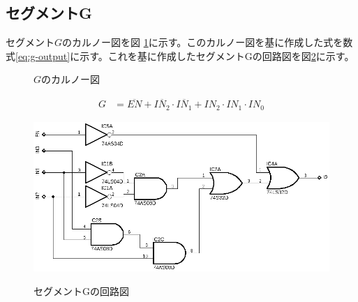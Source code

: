 \documentclass[a4paper,11pt,dvipdfmx]{jsarticle}
\begin{document}
\subsection{セグメントG}
セグメント$G$のカルノー図を図 \ref{fig:karnoG}に示す。このカルノー図を基に作成した式を数式\eqref{eq:g-output}に示す。これを基に作成したセグメントGの回路図を図\ref{fig:segG}に示す。
\begin{figure}[htbp]
  \centering
  \caption{\(G\)のカルノー図}
  \label{fig:karnoG}
\end{figure}
\begin{align}
  G &= \overline{EN} + \overline{IN_2} \cdot \overline{IN_1}+ IN_2 \cdot IN_1 \cdot IN_0\label{eq:g-output}
\end{align}
\begin{figure}[htbp]
  \centering
  \includegraphics{./images/G.png}
  \label{fig:segG}
  \caption{セグメントGの回路図}
\end{figure}

\newpage
\end{document}
